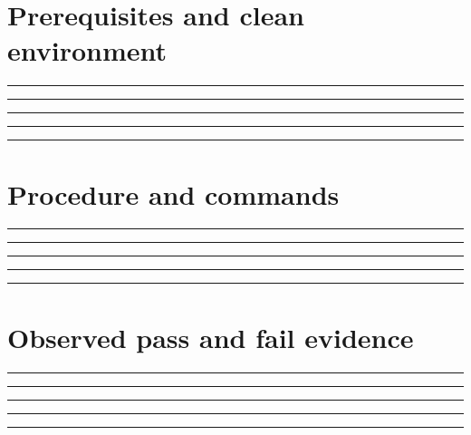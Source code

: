 \documentclass[11pt,letterpaper]{article}
\begin{document}
\section{Prerequisites and clean environment}
\vspace{2mm}
\noindent\rule{0.93\linewidth}{0.4pt}\par\vspace{13pt}
\noindent\rule{0.93\linewidth}{0.4pt}\par\vspace{13pt}
\noindent\rule{0.93\linewidth}{0.4pt}\par\vspace{13pt}
\noindent\rule{0.93\linewidth}{0.4pt}\par\vspace{13pt}
\noindent\rule{0.93\linewidth}{0.4pt}\par\vspace{13pt}
\section{Procedure and commands}
\vspace{2mm}
\noindent\rule{0.93\linewidth}{0.4pt}\par\vspace{13pt}
\noindent\rule{0.93\linewidth}{0.4pt}\par\vspace{13pt}
\noindent\rule{0.93\linewidth}{0.4pt}\par\vspace{13pt}
\noindent\rule{0.93\linewidth}{0.4pt}\par\vspace{13pt}
\noindent\rule{0.93\linewidth}{0.4pt}\par\vspace{13pt}
\section{Observed pass and fail evidence}
\vspace{2mm}
\noindent\rule{0.93\linewidth}{0.4pt}\par\vspace{13pt}
\noindent\rule{0.93\linewidth}{0.4pt}\par\vspace{13pt}
\noindent\rule{0.93\linewidth}{0.4pt}\par\vspace{13pt}
\noindent\rule{0.93\linewidth}{0.4pt}\par\vspace{13pt}
\noindent\rule{0.93\linewidth}{0.4pt}\par\vspace{13pt}
\end{document}
